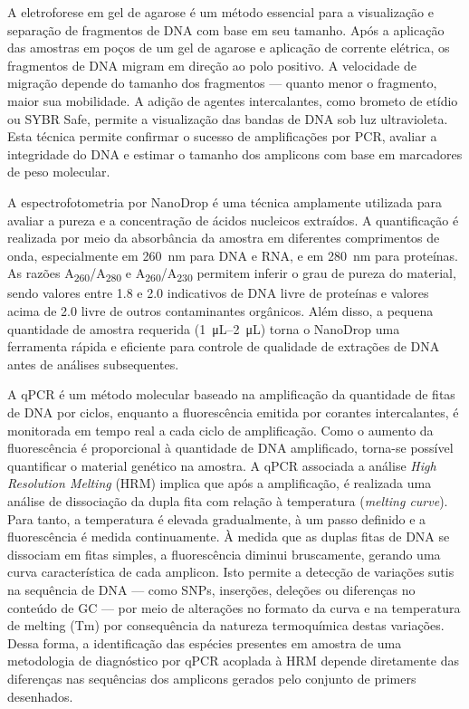 A eletroforese em gel de agarose é um método essencial para a visualização e
separação de fragmentos de DNA com base em seu tamanho.  Após a aplicação das
amostras em poços de um gel de agarose e aplicação de corrente elétrica, os
fragmentos de DNA migram em direção ao polo positivo. A velocidade de migração
depende do tamanho dos fragmentos — quanto menor o fragmento, maior sua
mobilidade.  A adição de agentes intercalantes, como brometo de etídio ou SYBR
Safe, permite a visualização das bandas de DNA sob luz ultravioleta.  Esta
técnica permite confirmar o sucesso de amplificações por PCR, avaliar a
integridade do DNA e estimar o tamanho dos amplicons com base em marcadores de
peso molecular\cite{costa1998leishmaniose}.

A espectrofotometria por NanoDrop é uma técnica amplamente utilizada para
avaliar a pureza e a concentração de ácidos nucleicos extraídos. A quantificação
é realizada por meio da absorbância da amostra em diferentes comprimentos de
onda, especialmente em \qty{260}{\nano\meter} para DNA e RNA, e em 
\qty{280}{\nano\meter} para proteínas. As razões
A\textsubscript{260}/A\textsubscript{280} e
A\textsubscript{260}/A\textsubscript{230} permitem inferir o grau de pureza do
material, sendo valores entre \num{1.8} e \num{2.0} indicativos de DNA livre de
proteínas e valores acima de \num{2.0} livre de outros contaminantes
orgânicos\cite{nanodrop}. Além disso, a pequena quantidade de amostra requerida
(\qtyrange{1}{2}{\micro\liter}) torna o NanoDrop uma ferramenta rápida e eficiente para
controle de qualidade de extrações de DNA antes de análises subsequentes.

A qPCR é um método molecular baseado na amplificação da quantidade de fitas de
DNA por ciclos, enquanto a fluorescência emitida por corantes intercalantes, é
monitorada em tempo real a cada ciclo de amplificação.  Como o aumento da
fluorescência é proporcional à quantidade de DNA amplificado, torna-se possível
quantificar o material genético na amostra\cite{Galluzi2018}. A qPCR associada a
análise \textit{High Resolution Melting} (HRM) implica que após a amplificação,
é realizada uma análise de dissociação da dupla fita com relação à temperatura
(\textit{melting curve}). Para tanto, a temperatura é elevada gradualmente, à um
passo definido e a fluorescência é medida continuamente. À medida que as duplas
fitas de DNA se dissociam em fitas simples, a fluorescência diminui bruscamente,
gerando uma curva característica de cada amplicon. Isto permite a detecção de
variações sutis na sequência de DNA — como SNPs, inserções, deleções ou
diferenças no conteúdo de GC — por meio de alterações no formato da curva e na
temperatura de melting (Tm)\cite{Wittwer2009} por consequência da natureza
termoquímica destas variações. Dessa forma, a identificação das espécies
presentes em amostra de uma metodologia de diagnóstico por qPCR acoplada à HRM
depende diretamente das diferenças nas sequências dos amplicons gerados pelo
conjunto de primers desenhados. 

